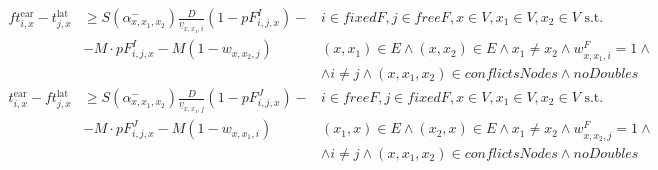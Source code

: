 \documentclass[../thesis.tex]{subfiles}
\begin{document}
{\begin{align}
ft^\text{ear}_{i,x}- t^\text{lat}_{j,x}&\geq S(\alpha^-_{x,x_1,x_2})\frac D {\underline v_{x,x_1,i}} (1-pF^I_{i,j,x})-&
i \in fixedF, j\in freeF, x\in V,x_1\in V,x_2\in V\text { s.t. }
\nonumber\\
&  -M\cdot pF^I_{i,j,x} - M(1-w_{x,x_2,j})&
(x,x_1)\in E\land (x,x_2)\in E\land x_1\neq x_2\land w^F_{x,x_1,i}=1\land\nonumber\\
&&\land i\neq j \land (x,x_1,x_2)\in conflictsNodes\land noDoubles\\
t^\text{ear}_{i,x}- ft^\text{lat}_{j,x}&\geq S(\alpha^-_{x,x_1,x_2}) \frac D {\underline v_{x,x_1,j}} (1-pF^J_{i,j,x})-&
i \in freeF, j\in fixedF, x\in V,x_1\in V,x_2\in V\text { s.t. }
\nonumber\\
 &-M\cdot pF^J_{i,j,x} - M(1-w_{x,x_1,i}) &
(x_1,x)\in E\land (x_2,x)\in E\land x_1\neq x_2\land w^F_{x,x_2,j}=1\land\nonumber\\
&&\land i\neq j\land (x,x_1,x_2)\in conflictsNodes\land noDoubles
\end{align}




}
\end{document}
